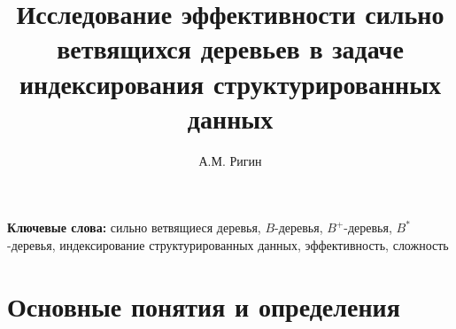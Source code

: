 \documentclass{llncs}
\begin{document}
	
	\title{Исследование эффективности сильно ветвящихся деревьев в задаче индексирования структурированных данных}
	
	\author{
		А.М. Ригин
	}
	
	
	\maketitle
	
	
	
	\textbf{Ключевые слова:} сильно ветвящиеся деревья, $B$-деревья, $B^+$-деревья, $B^*$-деревья, индексирование структурированных данных, эффективность, сложность
	
	\section{Основные понятия и определения}
	
\end{document}
